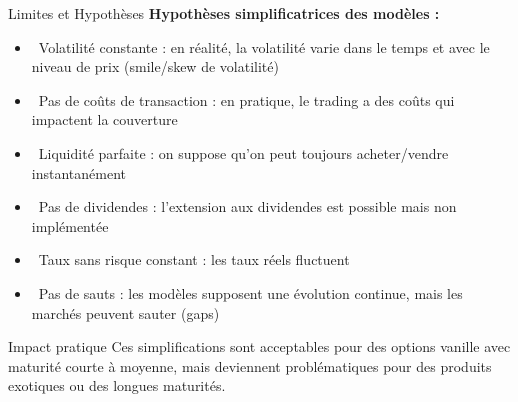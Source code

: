 \documentclass[aspectratio=169, 10pt]{beamer}
\begin{document}
\begin{frame}{Limites et Hypothèses}
    \textbf{Hypothèses simplificatrices des modèles :}
    \begin{itemize}
        \item {} \ Volatilité constante : en réalité, la volatilité varie dans le temps et avec le niveau de prix (smile/skew de volatilité)
        \item {} \ Pas de coûts de transaction : en pratique, le trading a des coûts qui impactent la couverture
        \item {} \ Liquidité parfaite : on suppose qu'on peut toujours acheter/vendre instantanément
        \item {} \ Pas de dividendes : l'extension aux dividendes est possible mais non implémentée
        \item {} \ Taux sans risque constant : les taux réels fluctuent
        \item {} \ Pas de sauts : les modèles supposent une évolution continue, mais les marchés peuvent sauter (gaps)
    \end{itemize}
    
    \vspace{0.3cm}
    \begin{block}{Impact pratique}
    Ces simplifications sont acceptables pour des options vanille avec maturité courte à moyenne, mais deviennent problématiques pour des produits exotiques ou des longues maturités.
    \end{block}
\end{frame}
\end{document}
